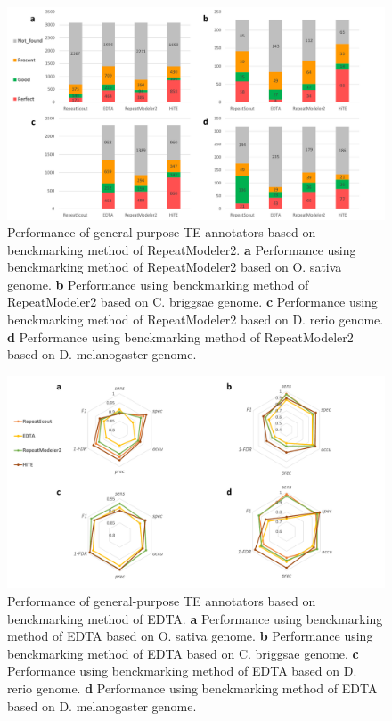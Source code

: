 \documentclass{bmcart}
\begin{document}

\begin{figure}[h!]
	\centerline{\includegraphics[width=1.0\textwidth]{figures/RM2Results.pdf}}
	\caption{Performance of general-purpose TE annotators based on benckmarking method of RepeatModeler2. \textbf{a} Performance using benckmarking method of RepeatModeler2 based on O. sativa genome. \textbf{b} Performance using benckmarking method of RepeatModeler2 based on C. briggsae genome. \textbf{c} Performance using benckmarking method of RepeatModeler2 based on D. rerio genome. \textbf{d} Performance using benckmarking method of RepeatModeler2 based on D. melanogaster genome.}
	\label{fig:rm2_results}
\end{figure}

\begin{figure}[h!]
	\centerline{\includegraphics[width=1.0\textwidth]{figures/EDTAResults.pdf}}
	\caption{Performance of general-purpose TE annotators based on benckmarking method of EDTA.  \textbf{a} Performance using benckmarking method of EDTA based on O. sativa genome. \textbf{b} Performance using benckmarking method of EDTA based on C. briggsae genome. \textbf{c} Performance using benckmarking method of EDTA based on D. rerio genome. \textbf{d} Performance using benckmarking method of EDTA based on D. melanogaster genome.}
	\label{fig:edta_results}
\end{figure}
\end{document}
